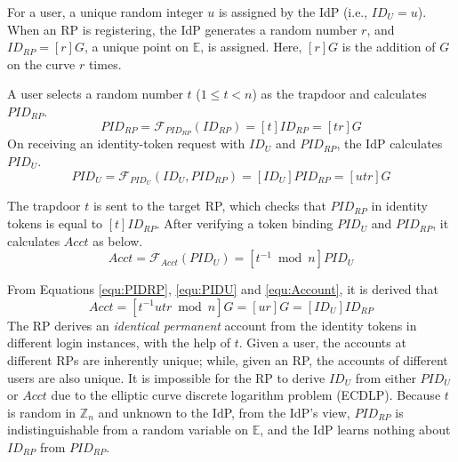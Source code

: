 For a user,
           a unique random integer $u$ is assigned by the IdP (i.e., $ID_U = u$).
When an RP is registering,
            the IdP generates a random number $r$, and $ID_{RP} = [r]G$, a unique point on $\mathbb{E}$, is assigned.
Here,
 $[r]G$ is the addition of $G$ on the curve $r$ times.

\vspace{0.5mm}
 A user selects a random number $t$ ($1 \leq t <n$) as the trapdoor
         and calculates $PID_{RP}$.
\begin{equation}
PID_{RP} = \mathcal{F}_{PID_{RP}}(ID_{RP}) = [t]{ID_{RP}} = [tr]G
\label{equ:PIDRP}
\end{equation}
On receiving an identity-token request with $ID_U$ and $PID_{RP}$,
    the IdP calculates $PID_{U}$.
\begin{equation}
PID_{U} = \mathcal{F}_{PID_U}(ID_U, PID_{RP}) =
  [{ID_U}]{PID_{RP}} = [utr]G
 \label{equ:PIDU}
\end{equation}


The trapdoor $t$ is sent to the target RP,
which checks that $PID_{RP}$ in identity tokens is equal to $[t]ID_{RP}$.
After verifying a token binding $PID_U$ and $PID_{RP}$,
    it calculates $Acct$ as below.
\begin{equation}
Acct = \mathcal{F}_{Acct}(PID_{U})
   = [t^{-1} \bmod n]PID_{U}
   \label{equ:Account}
\end{equation}

From Equations \ref{equ:PIDRP}, \ref{equ:PIDU} and \ref{equ:Account}, it is derived that
\begin{equation*}
   Acct =  [t^{-1}utr \bmod n]G = [ur]G = [ID_U]ID_{RP}
   \label{equ:AccountNotChanged}
\end{equation*}
The RP derives an \emph{identical permanent} account from the identity tokens in different login instances,
    with the help of $t$. %
Given a user, the accounts at different RPs are inherently unique;
while, given an RP, the accounts of different users are also unique.
It is impossible for the RP to derive $ID_U$ from either $PID_U$ or $Acct$ due to the elliptic curve discrete logarithm problem (ECDLP).
Because $t$ is random in $\mathbb{Z}_n$ and unknown to the IdP,
from the IdP's view,
    $PID_{RP}$ is indistinguishable from a random variable on $\mathbb{E}$,
    and the IdP learns nothing about $ID_{RP}$ from $PID_{RP}$.

